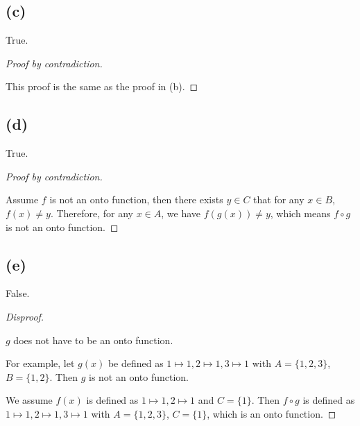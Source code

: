 \documentclass[a4paper,12pt]{article}
\begin{document}
\subsection*{(c)}

True.

\begin{proof}[Proof by contradiction]
$ $

This proof is the same as the proof in (b).
\end{proof}

\subsection*{(d)}

True.

\begin{proof}[Proof by contradiction]
$ $

Assume $f$ is not an onto function, then there exists $y \in C$ that for any $x \in B$, $f(x) \ne y$.
Therefore, for any $x \in A$, we have $f(g(x)) \ne y$, which means $f \circ g$ is not an onto function.
\end{proof}

\subsection*{(e)}

False.

\begin{proof}[Disproof]
$ $

$g$ does not have to be an onto function.

For example, let $g(x)$ be defined as $1 \mapsto 1, 2 \mapsto 1, 3 \mapsto 1$ with $A = \{1,2,3\}$, $B = \{1,2\}$.
Then $g$ is not an onto function.

We assume $f(x)$ is defined as $1 \mapsto 1, 2 \mapsto 1$ and $C = \{1\}$.
Then $f \circ g$ is defined as $1 \mapsto 1, 2 \mapsto 1, 3 \mapsto 1$ with $A = \{1,2,3\}$, $C = \{1\}$, which is an onto function.
\end{proof}
\end{document}

